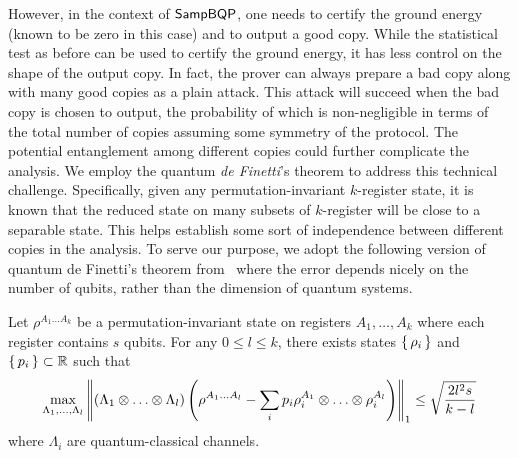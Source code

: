 However, in the context of $\operatorname{\mathsf{SampBQP}}$, one needs to certify the ground energy (known to be zero in this case) and to output a good copy.
While the statistical test as before can be used to certify the ground energy,
it has less control on the shape of the output copy.
In fact, the prover can always prepare a bad copy along with many good copies as a plain attack.
This attack will succeed when the bad copy is chosen to output, the probability of which is non-negligible in terms of the total number of copies assuming some symmetry of the protocol.
The potential entanglement among different copies could further complicate the analysis.
We employ the quantum \emph{de Finetti}'s theorem to address this technical challenge.
Specifically, given any permutation-invariant $k$-register state, it is known that the reduced state on many subsets of $k$-register will be close to a separable state.
This helps establish some sort of independence between different copies in the analysis.
To serve our purpose, we adopt the following version of quantum de Finetti's theorem from~\cite{Brandao2017} where the error depends nicely  on the number of qubits, rather than the dimension of quantum systems.

\begin{thm}
    \label{deFinetti}
    Let $\rho^{A_1\ldots A_k}$ be a permutation-invariant state on registers $A_1,\ldots,A_k$ where each register contains $s$ qubits.
    For any $0\leq l\leq k$,  there exists states $\set{\rho_i}$ and $\set{p_i}\subset\mathbb{R}$ such that
    $$\max_{\Lambda_1,\ldots,\Lambda_l}
    \left\lVert(\Lambda_1\otimes\ldots\otimes\Lambda_l)\left(\rho^{A_1\ldots A_l}-\sum_ip_i\rho_i^{A_1}\otimes\ldots\otimes\rho_i^{A_l}\right)\right\rVert_1
    \leq\sqrt{\frac{2l^2s}{k-l}}$$
    where $\Lambda_i$ are quantum-classical channels.
\end{thm}





